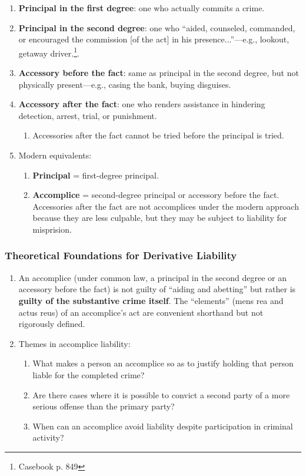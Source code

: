 \begin{enumerate}
    \item \textbf{Principal in the first degree}: one who actually commits a 
    crime.
    \item \textbf{Principal in the second degree}: one who ``aided, counseled, 
    commanded, or encouraged the commission [of the act] in his 
    presence...''---e.g., lookout, getaway driver.\footnote{Casebook p. 849}.
    \item \textbf{Accessory before the fact}: same as principal in the second 
    degree, but not physically present---e.g., casing the bank, buying 
    disguises.
    \item \textbf{Accessory after the fact}: one who renders assistance in 
    hindering detection, arrest, trial, or punishment.
    \begin{enumerate}
        \item Accessories after the fact cannot be tried before the principal 
        is tried.
    \end{enumerate}
    \item Modern equivalents:
    \begin{enumerate}
        \item \textbf{Principal} = first-degree principal.
        \item \textbf{Accomplice} = second-degree principal or accessory 
        before the fact. Accessories after the fact are not accomplices under 
        the modern approach because they are less culpable, but they may be 
        subject to liability for misprision. %
    \end{enumerate}
\end{enumerate}

\subsubsection{Theoretical Foundations for Derivative Liability}

\begin{enumerate}
    \item An accomplice (under common law, a principal in the second degree or 
    an accessory before the fact) is not guilty of ``aiding and abetting'' but 
    rather is \textbf{guilty of the substantive crime itself}. The 
    ``elements'' (mens rea and actus reus) of an accomplice's act are 
    convenient shorthand but not rigorously defined.
    \item Themes in accomplice liability:
    \begin{enumerate}
        \item What makes a person an accomplice so as to justify holding that 
        person liable for the completed crime?
        \item Are there cases where it is possible to convict a second party of a 
        more serious offense than the primary party?
        \item When can an accomplice avoid liability despite participation in 
        criminal activity?
    \end{enumerate}
\end{enumerate}

